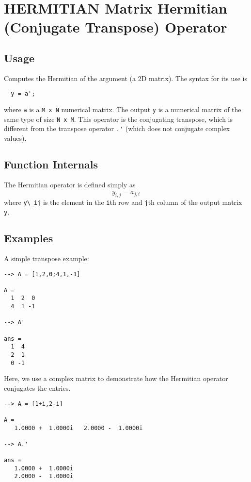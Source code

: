 \section{HERMITIAN Matrix Hermitian (Conjugate Transpose) Operator}

\subsection{Usage}

Computes the Hermitian of the argument (a 2D matrix).  The syntax for its use is
\begin{verbatim}
  y = a';
\end{verbatim}
where \verb|a| is a \verb|M x N| numerical matrix.  The output \verb|y| is a numerical matrix
of the same type of size \verb|N x M|.  This operator is the conjugating transpose,
which is different from the transpose operator \verb|.'| (which does not 
conjugate complex values).
\subsection{Function Internals}

The Hermitian operator is defined simply as
\[
  y_{i,j} = \overline{a_{j,i}}
\]
where \verb|y\_ij| is the element in the \verb|i|th row and \verb|j|th column of the output matrix \verb|y|.
\subsection{Examples}

A simple transpose example:
\begin{verbatim}
--> A = [1,2,0;4,1,-1]

A = 
  1  2  0 
  4  1 -1 

--> A'

ans = 
  1  4 
  2  1 
  0 -1 
\end{verbatim}
Here, we use a complex matrix to demonstrate how the Hermitian operator conjugates the entries.
\begin{verbatim}
--> A = [1+i,2-i]

A = 
   1.0000 +  1.0000i   2.0000 -  1.0000i 

--> A.'

ans = 
   1.0000 +  1.0000i 
   2.0000 -  1.0000i 
\end{verbatim}
